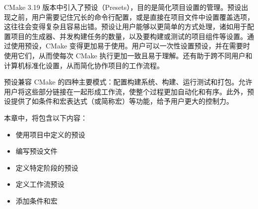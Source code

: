 CMake 3.19 版本中引入了预设（Presets），目的是简化项目设置的管理。预设出现之前，用户需要记住冗长的命令行配置，或是直接在项目文件中设置覆盖选项，这往往会变得复杂且容易出错。预设让用户能够以更简单的方式处理，诸如用于配置项目的生成器、并发构建任务的数量，以及要构建或测试的项目组件等设置。通过使用预设，CMake 变得更加易于使用。用户可以一次性设置预设，并在需要时使用它们，从而使每次 CMake 执行更加一致且易于理解。还有助于跨不同用户和计算机标准化设置，从而简化协作项目的工作流程。

预设兼容 CMake 的四种主要模式：配置构建系统、构建、运行测试和打包。允许用户将这些部分链接在一起形成工作流，使整个过程更加自动化和有序。此外，预设提供了如条件和宏表达式（或简称宏）等功能，给予用户更大的控制力。

本章中，将包含以下内容：

\begin{itemize}
\item
使用项目中定义的预设

\item
编写预设文件

\item
定义特定阶段的预设

\item
定义工作流预设

\item
添加条件和宏
\end{itemize}


